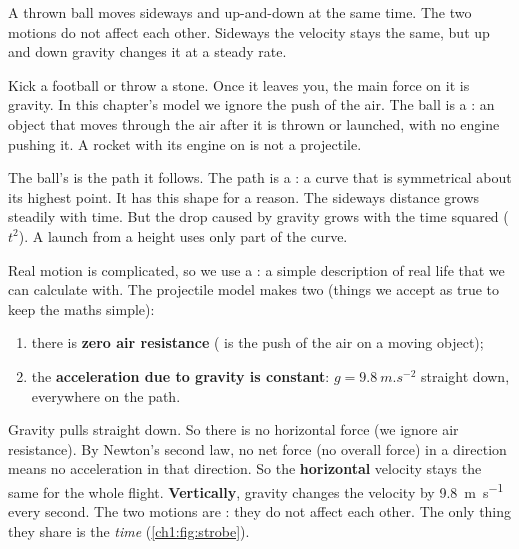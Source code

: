 \begin{bigidea}
A thrown ball moves sideways and up-and-down at the same time. The two motions do not
affect each other. Sideways the velocity stays the same, but up and down gravity changes it
at a steady rate.
\end{bigidea}

\begin{keywords}
\end{keywords}

Kick a football or throw a stone. Once it leaves you, the main force on it is gravity. In
this chapter's model we ignore the push of the air. The ball is a : an
object that moves through the air after it is thrown or launched, with no engine pushing it.
A rocket with its engine on is not a projectile.

The ball's  is the path it follows. The path is a : a curve
that is symmetrical about its highest point. It has this shape for a reason. The sideways
distance grows steadily with time. But the drop caused by gravity grows with the time
squared ($t^2$). A launch from a height uses only part of the curve.

Real motion is complicated, so we use a : a simple description of real life
that we can calculate with. The projectile model makes two  (things we
accept as true to keep the maths simple):
\begin{enumerate}
  \item there is \textbf{zero air resistance} ( is the push of the air
        on a moving object);
  \item the \textbf{acceleration due to gravity is constant}: $g = \qty{9.8}{m.s^{-2}}$
        straight down, everywhere on the path.
\end{enumerate}

Gravity pulls straight down. So there is no horizontal force (we ignore air resistance).
By Newton's second law, no net force (no overall force) in a direction means no acceleration
in that direction. So the \textbf{horizontal} velocity stays the same for the whole flight.
\textbf{Vertically}, gravity changes the velocity by \qty{9.8}{m.s^{-1}} every second. The two
motions are : they do not affect each other. The only thing they share is
the \emph{time} (\cref{ch1:fig:strobe}).

